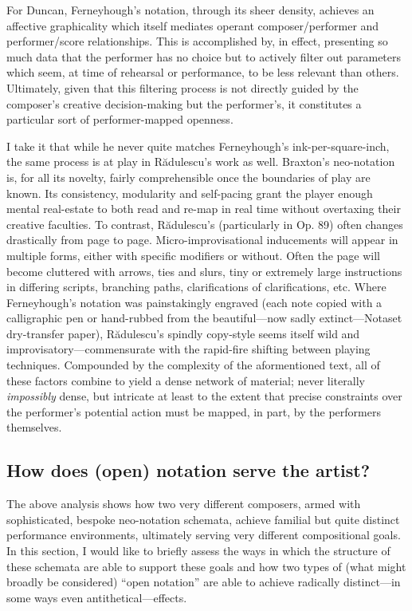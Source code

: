         For Duncan, Ferneyhough's notation, through its sheer density, achieves an affective graphicality which itself mediates operant composer/performer and performer/score relationships. This is accomplished by, in effect, presenting so much data that the performer has no choice but to actively filter out parameters which seem, at time of rehearsal or performance, to be less relevant than others. Ultimately, given that this filtering process is not directly guided by the composer's creative decision-making but the performer's, it constitutes a particular sort of performer-mapped openness.
        
        I take it that while he never quite matches Ferneyhough's ink-per-square-inch, the same process is at play in R\u{a}dulescu's work as well. Braxton's neo-notation is, for all its novelty, fairly comprehensible once the boundaries of play are known. Its consistency, modularity and self-pacing grant the player enough mental real-estate to both read and re-map in real time without overtaxing their creative faculties. To contrast, R\u{a}dulescu's (particularly in Op. 89) often changes drastically from page to page. Micro-improvisational inducements will appear in multiple forms, either with specific modifiers or without. Often the page will become cluttered with arrows, ties and slurs, tiny or extremely large instructions in differing scripts, branching paths, clarifications of clarifications, etc. Where Ferneyhough's notation was painstakingly engraved (each note copied with a calligraphic pen or hand-rubbed from the beautiful---now sadly extinct---Notaset dry-transfer paper), R\u{a}dulescu's spindly copy-style seems itself wild and improvisatory---commensurate with the rapid-fire shifting between playing techniques. Compounded by the complexity of the aformentioned text, all of these factors combine to yield a dense network of material; never literally \textit{impossibly} dense, but intricate at least to the extent that precise constraints over the performer's potential action must be mapped, in part, by the performers themselves.

\subsection{How does (open) notation serve the artist?}

    The above analysis shows how two very different composers, armed with sophisticated, bespoke neo-notation schemata, achieve familial but quite distinct performance environments, ultimately serving very different compositional goals. In this section, I would like to briefly assess the ways in which the structure of these schemata are able to support these goals and how two types of (what might broadly be considered) ``open notation'' are able to achieve radically distinct---in some ways even antithetical---effects.


